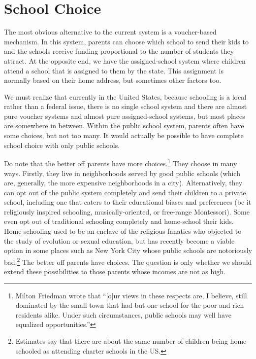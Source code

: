 \section{School Choice}

The most obvious alternative to the current system is a voucher-based
mechanism. In this system, parents can choose which school to send their kids
to and the schools receive funding proportional to the number of students they
attract. At the opposite end, we have the assigned-school system where children
attend a school that is assigned to them by the state. This assignment is
normally based on their home address, but sometimes other factors too.

We must realize that currently in the United States, because schooling is a
local rather than a federal issue, there is no single school system and there
are almost pure voucher systems and almost pure assigned-school systems, but
most places are somewhere in between. Within the public school system, parents
often have some choices, but not too many. It would actually be possible to
have complete school choice with only public schools.

Do note that the better off parents have more choices.\footnote{Milton
Friedman wrote that ``[o]ur views in these respects are, I believe,
still dominated by the small town that had but one school for the poor and rich
residents alike. Under such circumstances, public schools may well have
equalized opportunities.''} They choose in many
ways. Firstly, they live in neighborhoods served by good public schools (which
are, generally, the more expensive neighborhoods in a city). Alternatively,
they can opt out of the public system completely and send their children to a
private school, including one that caters to their educational biases and
preferences (be it religiously inspired schooling, musically-oriented, or
free-range Montessori). Some even opt out of traditional schooling completely
and home-school their kids. Home schooling used to be an enclave of the
religious fanatics who objected to the study of evolution or sexual education,
but has recently become a viable option in some places such as New York City
whose public schools are notoriously bad.\footnote{Estimates
say that there are about the same number of children being home-schooled as
attending charter schools in the US.}
The better off parents have choices. The question is only whether we should
extend these possibilities to those parents whose incomes are not as high.

